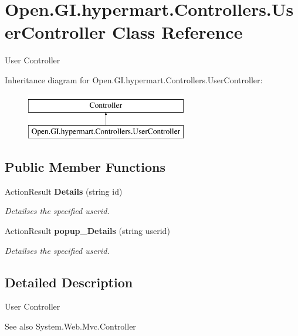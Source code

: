 \section{Open.\+G\+I.\+hypermart.\+Controllers.\+User\+Controller Class Reference}
\label{class_open_1_1_g_i_1_1hypermart_1_1_controllers_1_1_user_controller}


User Controller  


Inheritance diagram for Open.\+G\+I.\+hypermart.\+Controllers.\+User\+Controller\+:\begin{figure}[H]
\begin{center}
\leavevmode
\includegraphics[height=2.000000cm]{class_open_1_1_g_i_1_1hypermart_1_1_controllers_1_1_user_controller}
\end{center}
\end{figure}
\subsection*{Public Member Functions}
\begin{DoxyCompactItemize}
\item 
Action\+Result \textbf{ Details} (string id)
\begin{DoxyCompactList}\small\item\em Detailses the specified userid. \end{DoxyCompactList}\item 
Action\+Result \textbf{ popup\+\_\+\+Details} (string userid)
\begin{DoxyCompactList}\small\item\em Detailses the specified userid. \end{DoxyCompactList}\end{DoxyCompactItemize}


\subsection{Detailed Description}
User Controller 

\begin{DoxySeeAlso}{See also}
System.\+Web.\+Mvc.\+Controller


\end{DoxySeeAlso}


